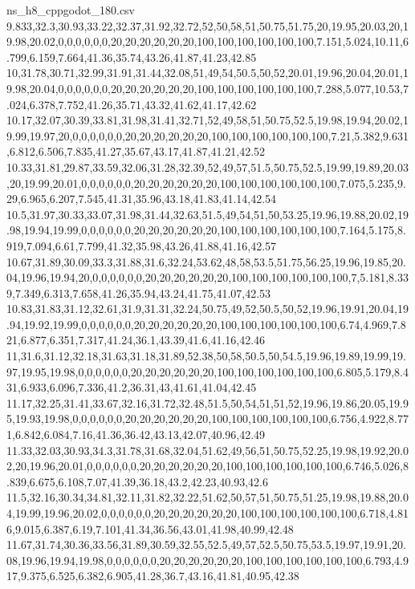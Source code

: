 \begin{filecontents*}[overwrite]{ns_h8_cppgodot_180.csv}
9.833,32.3,30.93,33.22,32.37,31.92,32.72,52,50,58,51,50.75,51.75,20,19.95,20.03,20,19.98,20.02,0,0,0,0,0,0,20,20,20,20,20,20,100,100,100,100,100,100,7.151,5.024,10.11,6.799,6.159,7.664,41.36,35.74,43.26,41.87,41.23,42.85
10,31.78,30.71,32.99,31.91,31.44,32.08,51,49,54,50.5,50,52,20.01,19.96,20.04,20.01,19.98,20.04,0,0,0,0,0,0,20,20,20,20,20,20,100,100,100,100,100,100,7.288,5.077,10.53,7.024,6.378,7.752,41.26,35.71,43.32,41.62,41.17,42.62
10.17,32.07,30.39,33.81,31.98,31.41,32.71,52,49,58,51,50.75,52.5,19.98,19.94,20.02,19.99,19.97,20,0,0,0,0,0,0,20,20,20,20,20,20,100,100,100,100,100,100,7.21,5.382,9.631,6.812,6.506,7.835,41.27,35.67,43.17,41.87,41.21,42.52
10.33,31.81,29.87,33.59,32.06,31.28,32.39,52,49,57,51.5,50.75,52.5,19.99,19.89,20.03,20,19.99,20.01,0,0,0,0,0,0,20,20,20,20,20,20,100,100,100,100,100,100,7.075,5.235,9.29,6.965,6.207,7.545,41.31,35.96,43.18,41.83,41.14,42.54
10.5,31.97,30.33,33.07,31.98,31.44,32.63,51.5,49,54,51,50,53.25,19.96,19.88,20.02,19.98,19.94,19.99,0,0,0,0,0,0,20,20,20,20,20,20,100,100,100,100,100,100,7.164,5.175,8.919,7.094,6.61,7.799,41.32,35.98,43.26,41.88,41.16,42.57
10.67,31.89,30.09,33.3,31.88,31.6,32.24,53.62,48,58,53.5,51.75,56.25,19.96,19.85,20.04,19.96,19.94,20,0,0,0,0,0,0,20,20,20,20,20,20,100,100,100,100,100,100,7,5.181,8.339,7.349,6.313,7.658,41.26,35.94,43.24,41.75,41.07,42.53
10.83,31.83,31.12,32.61,31.9,31.31,32.24,50.75,49,52,50.5,50,52,19.96,19.91,20.04,19.94,19.92,19.99,0,0,0,0,0,0,20,20,20,20,20,20,100,100,100,100,100,100,6.74,4.969,7.821,6.877,6.351,7.317,41.24,36.1,43.39,41.6,41.16,42.46
11,31.6,31.12,32.18,31.63,31.18,31.89,52.38,50,58,50.5,50,54.5,19.96,19.89,19.99,19.97,19.95,19.98,0,0,0,0,0,0,20,20,20,20,20,20,100,100,100,100,100,100,6.805,5.179,8.431,6.933,6.096,7.336,41.2,36.31,43,41.61,41.04,42.45
11.17,32.25,31.41,33.67,32.16,31.72,32.48,51.5,50,54,51,51,52,19.96,19.86,20.05,19.95,19.93,19.98,0,0,0,0,0,0,20,20,20,20,20,20,100,100,100,100,100,100,6.756,4.922,8.771,6.842,6.084,7.16,41.36,36.42,43.13,42.07,40.96,42.49
11.33,32.03,30.93,34.3,31.78,31.68,32.04,51.62,49,56,51,50.75,52.25,19.98,19.92,20.02,20,19.96,20.01,0,0,0,0,0,0,20,20,20,20,20,20,100,100,100,100,100,100,6.746,5.026,8.839,6.675,6.108,7.07,41.39,36.18,43.2,42.23,40.93,42.6
11.5,32.16,30.34,34.81,32.11,31.82,32.22,51.62,50,57,51,50.75,51.25,19.98,19.88,20.04,19.99,19.96,20.02,0,0,0,0,0,0,20,20,20,20,20,20,100,100,100,100,100,100,6.718,4.816,9.015,6.387,6.19,7.101,41.34,36.56,43.01,41.98,40.99,42.48
11.67,31.74,30.36,33.56,31.89,30.59,32.55,52.5,49,57,52.5,50.75,53.5,19.97,19.91,20.08,19.96,19.94,19.98,0,0,0,0,0,0,20,20,20,20,20,20,100,100,100,100,100,100,6.793,4.917,9.375,6.525,6.382,6.905,41.28,36.7,43.16,41.81,40.95,42.38

\end{filecontents*}
